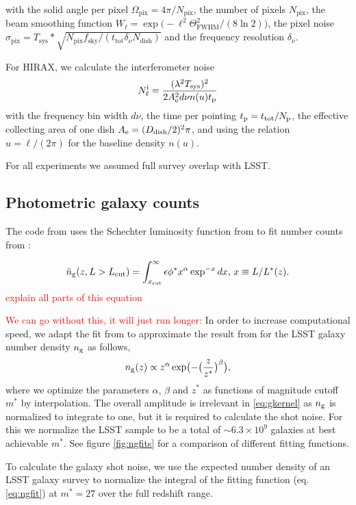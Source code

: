 \documentclass[useAMS,usenatbib]{mnras}
\newcommand{\be}{\begin{equation}}
\newcommand{\ee}{\end{equation}}
\newcommand{\ama}[1]{\textcolor{red}{{#1}}}
\begin{document}
with the solid angle per pixel $\Omega_\mathrm{pix} = 4\pi/N_\mathrm{pix}$, the number of pixels $N_\mathrm{pix}$, the beam smoothing function $W_\ell = \exp\bigl(-\ell^2 \Theta_\mathrm{FWHM}^2/(8\ln{2})\bigr)$, the pixel noise $\sigma_\mathrm{pix} = T_\mathrm{sys} * \sqrt{ N_\mathrm{pix} f_\mathrm{sky} / ( t_\mathrm{tot} \delta_\nu N_\mathrm{dish})}$ and the frequency resolution $\delta_\nu$.

For HIRAX, we calculate the interferometer noise
\begin{equation}
  N^{\rm i}_\ell = \frac{(\lambda^2 T_{\rm sys})^2}{2 A_{\rm e}^2 d\nu n(u) t_{\rm p}}
\end{equation}
with the frequency bin width $d\nu$, the time per pointing $t_{\rm p} = t_{\rm tot} / N_{\rm p}$, the effective collecting area of one dish $A_{\rm e} = (D_{\rm dish}/2)^2 \pi$, and using the relation $u = \ell / (2 \pi)$ for the baseline density $n(u)$.

For all experiments we assumed full survey overlap with LSST.
\subsection{Photometric galaxy counts}


The code from \cite{0004-637X-814-2-145} uses the Schechter luminosity function from \cite{2010MNRAS.402.1330G} to fit number counts from \cite{2013LRR....16....6A}:

\be 
\tilde{n}_{\rm g}(z, L>L_{\rm cut}) = \int_{x_{\rm cut}}^\infty \epsilon \phi^* x^\alpha \exp^{-x} dx,\, x\equiv L/L^*(z).\nonumber
\ee
\ama{explain all parts of this equation}

\ama{We can go without this, it will just run longer:}
In order to increase computational speed, we adapt the fit from \cite{2009arXiv0912.0201L} to approximate the result from \cite{0004-637X-814-2-145} for the LSST galaxy number density $n_{\rm g}$ as follows,
\be
n_{\rm g}(z) \propto z^\alpha \exp \bigl( -\bigl(\frac{z}{z^*}\bigr)^\beta \bigr),
\label{eq:ngfit}
\ee
where we optimize the parameters $\alpha$, $\beta$ and $z^*$ as functions of magnitude cutoff $m^*$ by interpolation. The overall amplitude is irrelevant in \ref{eq:gkernel} as $n_{\rm g}$ is normalized to integrate to one, but it is required to calculate the shot noise. For this we normalize the LSST sample to be a total of $\sim 6.3\times 10^9$ galaxies at best achievable $m^*$. See figure \ref{fig:ngfits} for a comparison of different fitting functions.

To calculate the galaxy shot noise, we use the expected number density of an LSST galaxy survey \citep{0004-637X-814-2-145} to normalize the integral of the fitting function (eq. \ref{eq:ngfit}) at $m^* = 27$ over the full redshift range. 
\end{document}
